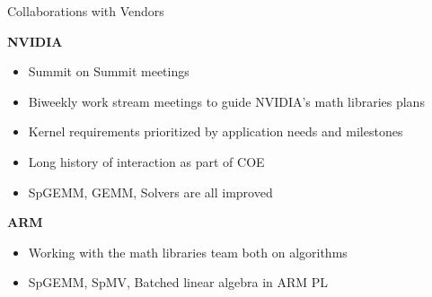 \begin{frame}[fragile]{Collaborations with Vendors}

\textbf{NVIDIA}
\begin{itemize}
  \item Summit on Summit meetings
  \item Biweekly work stream meetings to guide NVIDIA's math libraries plans
  \item Kernel requirements prioritized by application needs and milestones
  \item Long history of interaction as part of COE
  \item SpGEMM, GEMM, Solvers are all improved
\end{itemize}

\textbf{ARM}
\begin{itemize}
  \item Working with the math libraries team both on algorithms
  \item SpGEMM, SpMV, Batched linear algebra in ARM PL
\end{itemize}


\end{frame}

